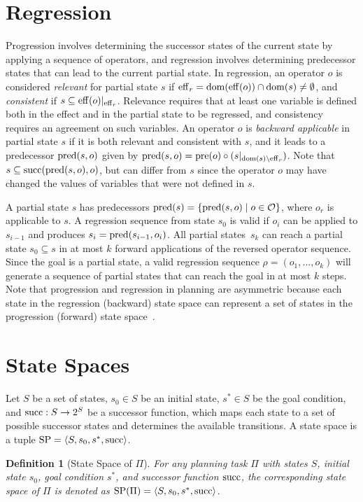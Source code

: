 \documentclass[ppgc,diss,english]{iiufrgs}
\newtheorem{definition}{Definition}
\begin{document}
\section{Regression}
\label{background-regression}
Progression involves determining the successor states of the current state by applying a sequence of operators, and regression involves determining predecessor states that can lead to the current partial state.
In regression, an operator $o$ is considered \emph{relevant} for partial state $s$ if $\operatorname{eff}_r = \operatorname{dom}(\operatorname{eff}(o)) \cap \operatorname{dom}(s) \neq \emptyset$, and \emph{consistent} if $s \subseteq \operatorname{eff}(o)|_{\operatorname{eff}_r}$. Relevance requires that at least one variable is defined both in the effect and in the partial state to be regressed, and consistency requires an agreement on such variables. An operator $o$ is \emph{backward applicable} in partial state $s$ if it is both relevant and consistent with $s$, and it leads to a predecessor $\operatorname{pred}(s,o)$ given by $\operatorname{pred}(s,o)=\operatorname{pre}(o)\circ (s|_{\operatorname{dom}(s)\setminus\operatorname{eff}_r})$. Note that $s \subseteq \operatorname{succ}(\operatorname{pred}(s,o),o)$, but can differ from $s$ since the operator $o$ may have changed the values of variables that were not defined in $s$.

A partial state $s$ has predecessors $\operatorname{pred}(s)=\{\operatorname{pred}(s,o)\mid o \in \mathcal{O}\}$, where $o_{r}$ is applicable to $s$. A regression sequence from state $s_0$ is valid if $o_i$ can be applied to $s_{i-1}$ and produces $s_i=\operatorname{pred}(s_{i-1},o_i)$. All partial states~$s_k$ can reach a partial state $s_{0} \subseteq s$ in at most $k$ forward applications of the reversed operator sequence.
Since the goal is a partial state, a valid regression sequence $\rho=(o_1,\ldots,o_k)$ will generate a sequence of partial states that can reach the goal in at most $k$ steps.
Note that progression and regression in planning are asymmetric because each state in the regression (backward) state space can represent a set of states in the progression (forward) state space~\cite{Alcazar.etal/2013}.


\section{State Spaces}
\label{background-state-spaces}
Let $S$ be a set of states, $s_0 \in S$ be an initial state, $s^{*} \in S$ be the goal condition, and $\operatorname{succ} : S \to 2^S$ be a successor function, which maps each state to a set of possible successor states and determines the available transitions. A state space is a tuple ${\text{SP}}=\langle S, s_0, s^{*}, \operatorname{succ} \rangle$.
\begin{definition}[State Space of $\Pi$]
For any planning task $\Pi$ with states $S$, initial state $s_0$, goal condition $s^{*}$, and successor function $\operatorname{succ}$, the corresponding state space of $\Pi$ is denoted as ${\text{SP}}(\Pi) = \langle S, s_0, s^{*}, \operatorname{succ} \rangle$.
\end{definition}
\end{document}
